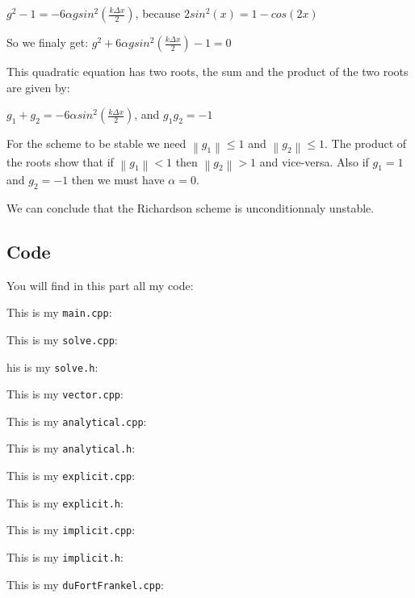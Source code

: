 \documentclass [10 pt, a4 paper]{article}
\begin{document}
$g^{2} - 1 = -6\alpha g sin^{2}(\frac{k\Delta x}{2})$, because $ 2sin^{2}(x) = 1 - cos(2x)$

So we finaly get: 
$g^{2} + 6\alpha g sin^{2}(\frac{k\Delta x}{2}) - 1 = 0$

This quadratic equation has two roots, the sum and the product of the two roots are given by:

$g_{1} + g_{2} = - 6 \alpha sin^{2}(\frac{k\Delta x}{2})$, and $g_{1} g_{2} = -1$

For the scheme to be stable we need $\left \|  g_{1} \right \| \leq 1$ and $\left \|  g_{2} \right \| \leq 1$.
The product of the roots show that if $\left \|  g_{1} \right \| < 1$ then $\left \|  g_{2} \right \| > 1$
and vice-versa. Also if $g_{1} = 1$ and $g_{2} = -1$ then we must have $\alpha = 0$.

We can conclude that the Richardson scheme is unconditionnaly unstable.

\subsection{Code}
You will find in this part all my code:


 
This is my \texttt{main.cpp}:


This is my \texttt{solve.cpp}:


his is my \texttt{solve.h}:


This is my \texttt{vector.cpp}:


This is my \texttt{analytical.cpp}:


This is my \texttt{analytical.h}:


This is my \texttt{explicit.cpp}:


This is my \texttt{explicit.h}:


This is my \texttt{implicit.cpp}:


This is my \texttt{implicit.h}:


This is my \texttt{duFortFrankel.cpp}:

\end{document}
